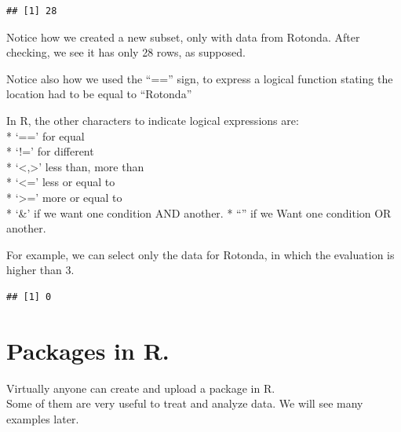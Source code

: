 \documentclass[
]{book}
\newenvironment{Shaded}{\begin{snugshade}}{\end{snugshade}}
\newcommand{\DecValTok}[1]{\textcolor[rgb]{0.00,0.00,0.81}{#1}}
\newcommand{\FunctionTok}[1]{\textcolor[rgb]{0.00,0.00,0.00}{#1}}
\newcommand{\NormalTok}[1]{#1}
\newcommand{\OtherTok}[1]{\textcolor[rgb]{0.56,0.35,0.01}{#1}}
\newcommand{\SpecialCharTok}[1]{\textcolor[rgb]{0.00,0.00,0.00}{#1}}
\newcommand{\StringTok}[1]{\textcolor[rgb]{0.31,0.60,0.02}{#1}}
\begin{document}
\begin{verbatim}
## [1] 28
\end{verbatim}

Notice how we created a new subset, only with data from Rotonda. After checking, we see it has only 28 rows, as supposed.

Notice also how we used the ``=='' sign, to express a logical function stating the location had to be equal to ``Rotonda''

In R, the other characters to indicate logical expressions are:\\
* `==' for equal\\
* `!=' for different\\
* `\textless,\textgreater{}' less than, more than\\
* `\textless=' less or equal to\\
* `\textgreater=' more or equal to\\
* `\&' if we want one condition AND another.
* ``\textbar{}'' if we Want one condition OR another.

For example, we can select only the data for Rotonda, in which the evaluation is higher than 3.

\begin{Shaded}
\end{Shaded}

\begin{verbatim}
## [1] 0
\end{verbatim}

\hypertarget{packages-in-r.}{%
\section{Packages in R.}\label{packages-in-r.}}

Virtually anyone can create and upload a package in R.\\

Some of them are very useful to treat and analyze data. We will see many examples later.\\
\end{document}
